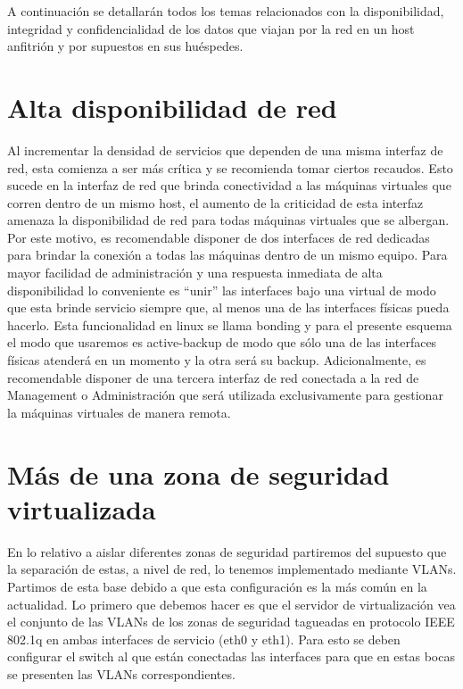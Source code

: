 	A continuación se detallarán todos los temas relacionados con la disponibilidad, integridad y confidencialidad de los datos que viajan por la red en un host anfitrión y por supuestos en sus huéspedes.
	
	\section{Alta disponibilidad de red}
	
	Al incrementar la densidad de servicios que dependen de una misma interfaz de red, esta comienza a ser más crítica y se recomienda tomar ciertos recaudos. Esto sucede en la interfaz de red que brinda conectividad a las máquinas virtuales que corren dentro de un mismo host, el aumento de la criticidad de esta interfaz amenaza la disponibilidad de red para todas máquinas virtuales que se albergan. Por este motivo, es recomendable disponer de dos interfaces de red dedicadas para brindar la conexión a todas las máquinas dentro de un mismo equipo. \newline
	Para mayor facilidad de administración y una respuesta inmediata de alta disponibilidad lo conveniente es “unir” las interfaces bajo una virtual de modo que esta brinde servicio siempre que, al menos una de las interfaces físicas pueda hacerlo. Esta funcionalidad en linux se llama bonding y para el presente esquema el modo que usaremos es active-backup de modo que sólo una de las interfaces físicas atenderá en un momento y la otra será su backup. \newline
	Adicionalmente, es recomendable disponer de una tercera interfaz de red conectada a la red de Management o Administración que será utilizada exclusivamente para gestionar la máquinas virtuales de manera remota.
	
	\section{Más de una zona de seguridad virtualizada}
	
	En lo relativo a aislar diferentes zonas de seguridad partiremos del supuesto que la separación de estas, a nivel de red, lo tenemos implementado mediante VLANs. Partimos de esta base debido a que esta configuración es la más común en la actualidad. \newline
	Lo primero que debemos hacer es que el servidor de virtualización vea el conjunto de las VLANs de los zonas de seguridad tagueadas en protocolo IEEE 802.1q en ambas interfaces de servicio (eth0 y eth1). Para esto se deben configurar el switch al que están conectadas las interfaces para que en estas bocas se presenten las VLANs correspondientes. \newline
	
